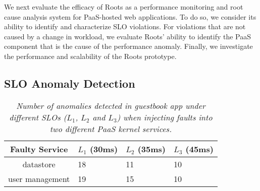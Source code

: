 We next evaluate the efficacy of Roots as a performance monitoring and root cause
analysis system for PaaS-hosted web applications.
To do so, we consider its ability to identify and characterize SLO violations.
For violations that are not caused by a change in workload, we evaluate Roots' ability to identify
the PaaS component that is the cause of the performance anomaly.
Finally, we investigate the performance and scalability of the Roots
prototype. 


\subsection{SLO Anomaly Detection}

\begin{table}
{\footnotesize
\begin{center}
\begin{tabular}{|c|p{1cm}|p{1cm}|p{1cm}|}
\hline
Faulty Service & $L_1$ (30ms) & $L_2$ (35ms) & $L_3$ (45ms) \\ \hline
datastore & 18 & 11 & 10 \\ \hline
user management & 19 & 15 & 10 \\ \hline
\end{tabular}
\end{center}
}
\caption{\textit{Number of anomalies detected in guestbook app under different SLOs 
($L_1$, $L_2$ and $L_3$) when injecting faults into two different PaaS kernel services.
\label{tab:anomaly_counts}
}}
\end{table}

